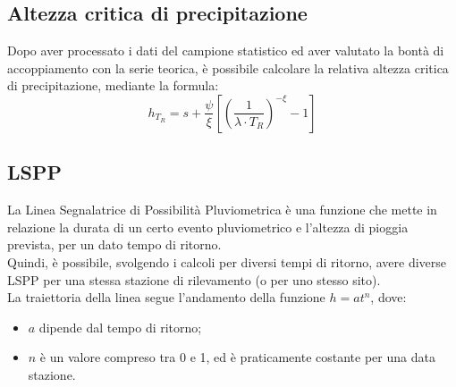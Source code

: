 \subsection{Altezza critica di precipitazione}
Dopo aver processato i dati del campione statistico ed aver valutato la bontà di accoppiamento con la serie teorica, è possibile calcolare la relativa altezza critica di precipitazione, mediante la formula:
\begin{equation}
    h_{T_R} = s + \frac{\psi}{\xi} \left[ \left(\frac{1}{\lambda \cdot T_R} \right) ^{-\xi} - 1 \right]
\end{equation}

\subsection{LSPP}
La Linea Segnalatrice di Possibilità Pluviometrica è una funzione che mette in relazione la durata di un certo evento pluviometrico e l'altezza di pioggia prevista, per un dato tempo di ritorno.\\
Quindi, è possibile, svolgendo i calcoli per diversi tempi di ritorno, avere diverse LSPP per una stessa stazione di rilevamento (o per uno stesso sito).\\
La traiettoria della linea segue l'andamento della funzione $h=at^n$, dove:
\begin{itemize}
\item $a$ dipende dal tempo di ritorno;    
\item $n$ è un valore compreso tra 0 e 1, ed è praticamente costante per una data stazione.
\end{itemize}


